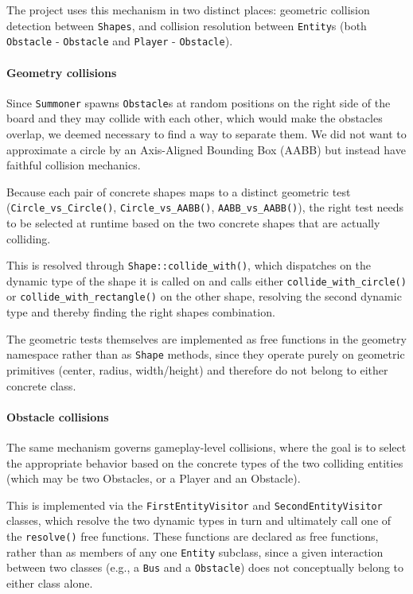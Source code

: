 \documentclass{article}
\begin{document}
The project uses this mechanism in two distinct places: geometric collision detection between \texttt{Shapes}, and collision resolution between \texttt{Entity}s (both \texttt{Obstacle} - \texttt{Obstacle} and \texttt{Player} - \texttt{Obstacle}).

\paragraph{Geometry collisions} 

Since \texttt{Summoner} spawns \texttt{Obstacle}s at random positions on the right side of the board and they may collide with each other, which would make the obstacles overlap, we deemed necessary to find a way to separate them. We did not want to approximate a circle by an Axis-Aligned Bounding Box (AABB) but instead have faithful collision mechanics.

Because each pair of concrete shapes maps to a distinct geometric test (\texttt{Circle\_vs\_Circle()}, \texttt{Circle\_vs\_AABB()}, \texttt{AABB\_vs\_AABB()}), the right test needs to be selected at runtime based on the two concrete shapes that are actually colliding. 

This is resolved through \texttt{Shape::collide\_with()}, which dispatches on the dynamic type of the shape it is called on and calls either \texttt{collide\_with\_circle()} or \texttt{collide\_with\_rectangle()} on the other shape, resolving the second dynamic type and thereby finding the right shapes combination. 

The geometric tests themselves are implemented as free functions in the geometry namespace rather than as \texttt{Shape} methods, since they operate purely on geometric primitives (center, radius, width/height) and therefore do not belong to either concrete class.

\paragraph{Obstacle collisions} The same mechanism governs gameplay-level collisions, where the goal is to select the appropriate behavior based on the concrete types of the two colliding entities (which may be two Obstacles, or a Player and an Obstacle). 

This is implemented via the \texttt{FirstEntityVisitor} and \texttt{SecondEntityVisitor} classes, which resolve the two dynamic types in turn and ultimately call one of the \texttt{resolve()} free functions. These functions are declared as free functions, rather than as members of any one \texttt{Entity} subclass, since a given interaction between two classes (e.g., a \texttt{Bus} and a \texttt{Obstacle}) does not conceptually belong to either class alone.
\end{document}
